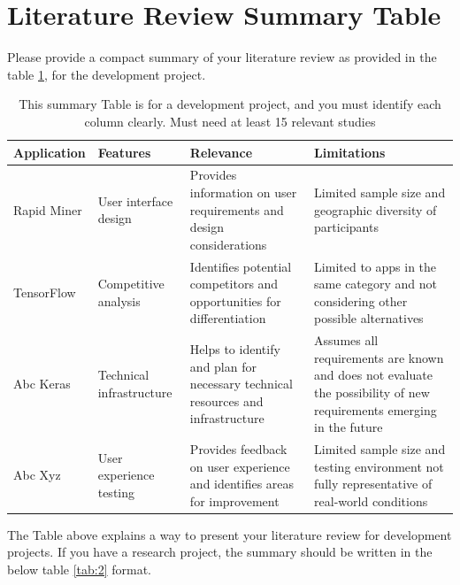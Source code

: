 \documentclass{FastFyp}
\begin{document}
\section{Literature Review Summary Table}
Please provide a compact summary of your literature review as provided in the table \ref{tab:1}, for the development project.
\begin{table}[!h]
\centering
\caption{This summary Table is for a development project, and you must identify each column clearly. Must need at least 15 relevant studies}
\begin{tabular}{|p{2.5cm}|p{2.5cm}|p{4cm}|p{5cm}|}
\hline
    \textbf{Application} & \textbf{Features} & \textbf{Relevance} & \textbf{Limitations} \\
\hline
Rapid Miner \cite{ref:Duda:2000} & User interface design & Provides information on user requirements and design considerations & Limited sample size and geographic diversity of participants \\
\hline
TensorFlow \cite{ref:SVMGuide} & Competitive analysis & Identifies potential competitors and opportunities for differentiation & Limited to apps in the same category and not considering other possible alternatives \\
\hline
Abc Keras \cite{ref:guyon:2007} & Technical infrastructure & Helps to identify and plan for necessary technical resources and infrastructure & Assumes all requirements are known and does not evaluate the possibility of new requirements emerging in the future \\
\hline
Abc Xyz \cite{ref:guyon:2007a} & User experience testing & Provides feedback on user experience and identifies areas for improvement & Limited sample size and testing environment not fully representative of real-world conditions \\
\hline
\end{tabular}
\label{tab:1}
\end{table}
The Table above explains a way to present your literature review for development projects. If you have a research project, the summary should be written in the below table \ref{tab:2} format.
\end{document}
